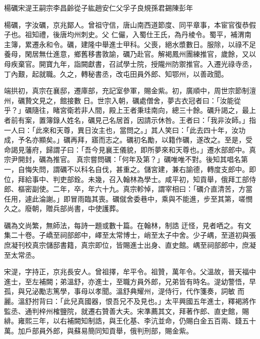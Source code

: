 
\begin{pinyinscope}

 楊礪宋湜王嗣宗李昌齡從子紘趙安仁父孚子良規孫君錫陳彭年



 楊礪，字汝礪，京兆鄮人。曾祖守信，唐山南西道節度、同平章事，本宦官復恭假子也。祖知禮，後唐均州刺史。父
 仁儼，入蜀仕王氏，為丹棱令。蜀平，補渭南主簿，累遷永和令。礪，建隆中舉進士甲科。父喪，絕水漿數日。服除，以祿不足養母，閑居無仕進意，鄉舊移書敦諭，礪乃赴官。解褐鳳州團練推官，歲餘，又以母疾棄官。開寶九年，詣闕獻書，召試學士院，授隴州防禦推官。入遷光祿寺丞，丁內艱，起就職。久之，轉秘書丞，改屯田員外郎、知鄂州，以善政聞。



 端拱初，真宗在襄邸，遷庫部，充記室參軍，賜金紫。初，廣順中，周世宗節制澶州，礪贄文見之，館接數
 日。世宗入朝，礪處僧舍，夢古衣冠者曰：「汝能從乎？」礪隨往，睹宮衛若非人間，殿上王者秉珪南向，總三十餘。礪升謁之，最上者前有案，置簿錄人姓名，礪見己名居首，因請示休咎。王者曰：「我非汝師。」指一人曰：「此來和天尊，異日汝主也，當問之。」其人笑曰：「此去四十年，汝功成，予名亦顯矣。」礪再拜，寤而志之。礪初名勵，以籍作礪，遂改之。至是，受命謁見藩府，歸謂子曰：「吾今見襄王儀貌，即所夢來和天尊也。」遷水部郎中。真宗尹開封，礪為推官。
 真宗嘗問礪：「何年及第？」礪唯唯不對。後知其唱名第一，自悔失問，謂礪不以科名自伐，甚重之。儲宮建，兼右諭德，轉度支郎中。即位，拜給事中、判吏部銓。未幾，召入翰林為學士。咸平初，知貢舉，俄拜工部侍郎、樞密副使。二年，卒，年六十九。真宗軫悼，謂宰相曰：「礪介直清苦，方當任用，遽此淪謝。」即冒雨臨其喪。礪僦舍委巷中，乘與不能進，步至其第，嗟憫久之。廢朝，贈兵部尚書，中使護葬。



 礪為文尚繁，無師法，每詩一題或數十篇。在翰林，制誥
 迂怪，見者哂之。有文集二十卷。子嶠至祠部郎中，嶧至太常博士，峭至太子中舍。少子嵎，至道初與張庶凝刊校真宗儲邸書籍，真宗即位，皆賜進士出身、直史館。嵎至祠部郎中，庶凝至太常丞。



 宋湜，字持正，京兆長安人。曾祖擇，牟平令。祖贊，萬年令。父溫故，晉天福中進士，至左補闕；弟溫舒，亦進士，至職方員外郎，兄弟皆有時名。湜幼警悟，早孤，與兄泌勵志篤學，事母以孝聞。溫舒典耀州，湜侍行，代作箋奏，詞敏
 而麗。溫舒拊背曰：「此兒真國器，恨吾兄不及見也。」太平興國五年進士，釋褐將作監丞、通判梓州榷鹽院，就遷右贊善大夫。宋準薦其文，拜著作郎、直史館，賜緋。雍熙三年，以右補闕知制誥，與王化基、李沆並命，仍賜白金五百兩、錢五十萬。加戶部員外郎，與蘇易簡同知貢舉，俄判刑部，賜金紫。




\end{pinyinscope}

